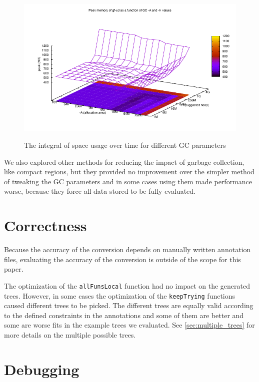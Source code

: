 \begin{figure}
      {\includegraphics[scale=0.5]{figure/gf-ud-peak-gc-space.pdf}}
    \caption{The integral of space usage over time for different GC parameters}
    \label{fig:gf-ud-integ-gc-space}
\end{figure}

We also explored other methods for reducing the impact of garbage collection, like compact regions\cite{yang2015efficient}, but they provided no improvement over the simpler method of tweaking the GC parameters and in some cases using them made performance worse, because they force all data stored to be fully evaluated.

\section{Correctness}

Because the accuracy of the conversion depends on manually written annotation files, evaluating the accuracy of the conversion is outside of the scope for this paper.

The optimization of the \texttt{allFunsLocal} function had no impact on the generated trees. However, in some cases the optimization of the \texttt{keepTrying} functions caused different trees to be picked. The different trees are equally valid according to the defined constraints in the annotations and some of them are better and some are worse fits in the example trees we evaluated. See \autoref{sec:multiple_trees} for more details on the multiple possible trees.

\section{Debugging}

